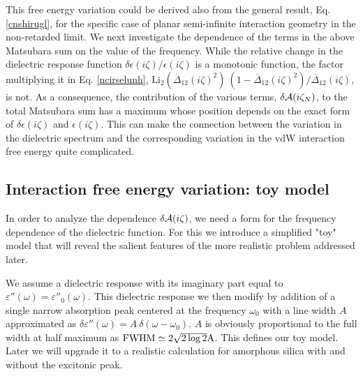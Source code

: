 \documentclass[letterpaper,twocolumn,amsmath,amssymb,floatfix,aps,superscriptaddress]{revtex4}
\begin{document}
This free energy variation could be derived also from the general result, Eq. \ref{cnshirugl},  for the specific case of  planar semi-infinite interaction geometry in the non-retarded limit. We next investigate  the dependence of the terms in the above Matsubara sum on the value of the frequency.  While the relative change in the dielectric response function ${\delta \epsilon(i \zeta)}/{\epsilon(i \zeta)}$ is a monotonic function, the factor multiplying it in  Eq. \ref{ncirselunh}, $ {\text{Li}_2\left(\overline\Delta_{12}(i \zeta) ^2\right)}~ {\left( 1 - \overline\Delta_{12}(i \zeta)^2 \right)}/{\overline\Delta_{12}(i \zeta)},$ is not.  As a consequence, the contribution of the various terms, $\delta{\cal A}(i\zeta_N)$,  to the total Matsubara sum has a maximum whose position depends on the exact form of $\delta \epsilon(i \zeta)$ and $\epsilon(i \zeta)$. This can make the connection between the variation in the dielectric spectrum and the corresponding variation in the vdW interaction free energy quite complicated.


\subsection{Interaction free energy variation: toy model}

In order to analyze the dependence $\delta{\cal A}(i\zeta)$, we need a form for the frequency dependence of the dielectric function. For this we introduce a simplified "toy" model that will reveal the salient features of the more realistic problem addressed later. 

We assume a dielectric response with its imaginary part equal to  $ {\varepsilon'' (\omega)} = {\varepsilon''_0 (\omega)}  \label{dhds}$. This dielectric response we then modify by addition of a single narrow absorption peak centered at the frequency $\omega_0$ with a line width ${A}$ approximated as ${\delta\varepsilon'' (\omega)} = A~ \delta(\omega - \omega_0)$. $A$ is obviously proportional to the full width at half maximum as $\rm FWHM \simeq 2 \sqrt{2 \log{2}} A$.
This defines our toy model. Later we will upgrade it to a realistic calculation for amorphous silica with and without the excitonic peak.
\end{document}
